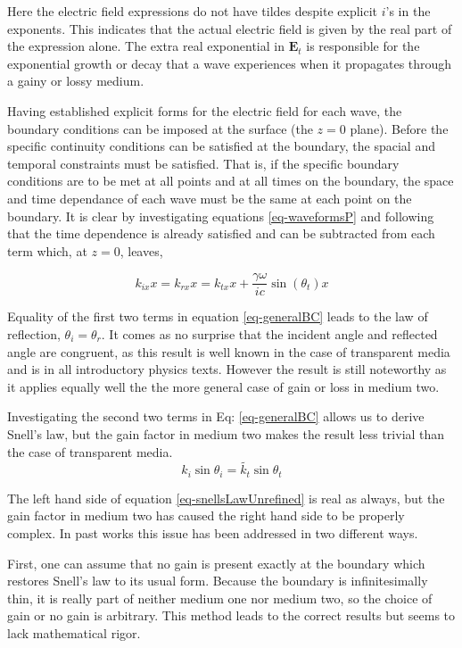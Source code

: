 \documentclass[12pt]{uthesis-v12}
\begin{document}
Here the electric field expressions do not have tildes despite explicit $i$'s in the exponents. This indicates that the actual electric field is given by the real part of the expression alone. The extra real exponential in $\mathbf{E}_t$ is responsible for the exponential growth or decay that a wave experiences when it propagates through a gainy or lossy medium.

Having established explicit forms for the electric field for each wave, the boundary conditions can be imposed at the surface (the $z=0$ plane). Before the specific continuity conditions can be satisfied at the boundary, the spacial and temporal constraints must be satisfied. That is, if the specific boundary conditions are to be met at all points and at all times on the boundary, the space and time dependance of each wave must be the same at each point on the boundary. It is clear by investigating equations \ref{eq-waveformsP} and following that the time dependence is already satisfied and can be subtracted from each term which, at $z=0$, leaves,

\begin{equation}\label{eq-generalBC}
k_{ix}x=
k_{rx}x=
k_{tx}x +\frac{\gamma\omega}{ic}\sin(\theta_t)x
\end{equation}

Equality of the first two terms in equation \ref{eq-generalBC} leads to the law of reflection, $\theta_i=\theta_r$.  It comes as no surprise that the incident angle and reflected angle are congruent, as this result is well known in the case of transparent media and is in all introductory physics texts. However the result is still noteworthy as it applies equally well the the more general case of gain or loss in medium two.

Investigating the second two terms in Eq: \ref{eq-generalBC} allows us to derive Snell's law, but the gain factor in medium two makes the result less trivial than the case of transparent media.
\begin{equation}\label{eq-snellsLawUnrefined}
k_i\sin\theta_i=\tilde{k_t}\sin\theta_t
\end{equation}

The left hand side of equation \ref{eq-snellsLawUnrefined} is real as always, but the gain factor in medium two has caused the right hand side to be properly complex. In past works this issue has been addressed in two different ways.

First, one can assume that no gain is present exactly at the boundary which restores Snell's law to its usual form. Because the boundary is infinitesimally thin, it is really part of neither medium one nor medium two, so the choice of gain or no gain is arbitrary. This method leads to the correct results but seems to lack mathematical rigor.
\end{document}

